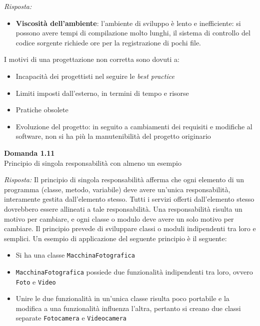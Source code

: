 \documentclass{article}
\newenvironment{problem}[2][Domanda]
    { \begin{mdframed}[backgroundcolor=gray!20] \textbf{#1 #2} \\}
    {  \end{mdframed}}
\newenvironment{solution}
    {\textit{Risposta:}}
    {}
\begin{document}
\begin{solution}
\begin{enumerate}
\begin{itemize}
		\item \textbf{Viscosità dell'ambiente}: l'ambiente di sviluppo è lento e inefficiente: si possono avere tempi di compilazione molto lunghi, il sistema di controllo del codice sorgente richiede ore per la registrazione di pochi file.
	\end{itemize}
\end{enumerate}
I motivi di una progettazione non corretta sono dovuti a:
\begin{itemize}
	\item Incapacità dei progettisti nel seguire le \textit{best practice}
	\item Limiti imposti dall'esterno, in termini di tempo e risorse
	\item Pratiche obsolete
	\item Evoluzione del progetto: in seguito a cambiamenti dei requisiti e modifiche al software, non si ha più la manutenibilità del progetto originario
\end{itemize}
\end{solution}


\begin{problem}{1.11}
Principio di singola responsabilità con almeno un esempio
\end{problem}
\begin{solution}
Il principio di singola responsabilità afferma che ogni elemento di un programma (classe, metodo, variabile) deve avere un'unica responsabilità, interamente gestita dall'elemento stesso.
Tutti i servizi offerti dall'elemento stesso dovrebbero essere allineati a tale responsabilità.
\newline
Una responsabilità risulta un motivo per cambiare, e ogni classe o modulo deve avere un solo motivo per cambiare.
\newline
Il principio prevede di sviluppare classi o moduli indipendenti tra loro e semplici.
Un esempio di applicazione del seguente principio è il seguente:
\begin{itemize}
	\item Si ha una classe \texttt{MacchinaFotografica}
	\item \texttt{MacchinaFotografica} possiede due funzionalità indipendenti tra loro, ovvero \texttt{Foto} e \texttt{Video}
	\item Unire le due funzionalità in un'unica classe risulta poco portabile e la modifica a una funzionalità influenza l'altra, pertanto si creano due classi separate \texttt{Fotocamera} e \texttt{Videocamera}
\end{itemize}
\end{solution}
\end{document}
